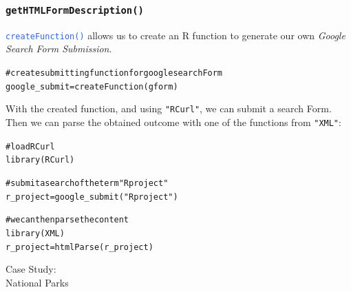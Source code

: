 \documentclass{beamer}\usepackage[]{graphicx}\usepackage[]{color}
\makeatletter
\newcommand{\hlstr}[1]{\textcolor[rgb]{0.063,0.58,0.627}{#1}}%
\newcommand{\hlcom}[1]{\textcolor[rgb]{0.588,0.588,0.588}{#1}}%
\newcommand{\hlstd}[1]{\textcolor[rgb]{0.196,0.196,0.196}{#1}}%
\newcommand{\hlkwb}[1]{\textcolor[rgb]{0.627,0,0.314}{#1}}%
\newcommand{\hlkwd}[1]{\textcolor[rgb]{0.78,0.227,0.412}{#1}}%
\newenvironment{kframe}{%
 \def\at@end@of@kframe{}%
 \ifinner\ifhmode%
  \def\at@end@of@kframe{\end{minipage}}%
  \begin{minipage}{\columnwidth}%
 \fi\fi%
 \def\FrameCommand##1{\hskip\@totalleftmargin \hskip-\fboxsep
 \colorbox{shadecolor}{##1}\hskip-\fboxsep
     \hskip-\linewidth \hskip-\@totalleftmargin \hskip\columnwidth}%
 \MakeFramed {\advance\hsize-\width
   \@totalleftmargin\z@ \linewidth\hsize
   \@setminipage}}%
 {\par\unskip\endMakeFramed%
 \at@end@of@kframe}
\newenvironment{knitrout}{}{} %
\newcommand{\code}[1]{\texttt{#1}}
\newcommand{\highcode}[1]{\textcolor{highlight}{\texttt{#1}}}
\makeatother
\begin{document}

\begin{frame}[fragile]
\frametitle{\code{getHTMLFormDescription()}}

\highcode{createFunction()} allows us to create an R function to generate our own \textit{Google Search Form Submission}. 
\begin{knitrout}\tiny
{}\color{fgcolor}\begin{kframe}
\begin{alltt}
\hlcom{# create submitting function for google search Form}
\hlstd{google_submit} \hlkwb{=} \hlkwd{createFunction}\hlstd{(gform)}
\end{alltt}
\end{kframe}
\end{knitrout}

With the created function, and using \code{"RCurl"}, we can submit a search Form. Then we can parse the obtained outcome with one of the functions from \code{"XML"}:
\begin{knitrout}\tiny
{}\color{fgcolor}\begin{kframe}
\begin{alltt}
\hlcom{# load RCurl}
\hlkwd{library}\hlstd{(RCurl)}

\hlcom{# submit a search of the term "R project"}
\hlstd{r_project} \hlkwb{=} \hlkwd{google_submit}\hlstd{(}\hlstr{"R project"}\hlstd{)}

\hlcom{# we can then parse the content}
\hlkwd{library}\hlstd{(XML)}
\hlstd{r_project} \hlkwb{=} \hlkwd{htmlParse}\hlstd{(r_project)}
\end{alltt}
\end{kframe}
\end{knitrout}

\end{frame}


\begin{frame}
 \begin{center}
  \Huge{\textcolor{mandarina}{Case Study: \\ National Parks}}
 \end{center}
\end{frame}

\end{document}
